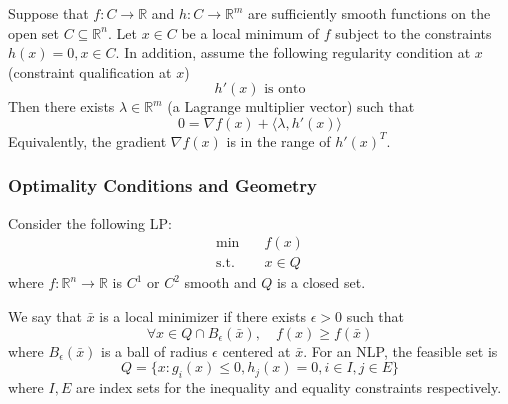 \begin{theorem}
    Suppose that $f: C \to \mathbb R$ and $h: C \to \mathbb R^m$ are sufficiently smooth functions on the open set $C \subseteq \mathbb R^n$. Let $x \in C$ be a local minimum of $f$ subject to the constraints $h(x) = 0, x \in C$. In addition, assume the following regularity condition at $x$ (constraint qualification at $x$) $$h'(x) \text{ is onto}$$
    Then there exists $\lambda \in \mathbb R^m$ (a Lagrange multiplier vector) such that $$0 = \nabla f(x) + \langle \lambda, h'(x) \rangle$$ Equivalently, the gradient $\nabla f(x)$ is in the range of $h'(x)^T$.
\end{theorem}
\subsubsection{Optimality Conditions and Geometry}
Consider the following LP:
\begin{align*}
    \min \quad & f(x) \\
    \text{s.t.} \quad & x \in Q
\end{align*}
where $f: \mathbb R^n \to \mathbb R$ is $C^1$ or $C^2$ smooth and $Q$ is a closed set.

We say that $\bar x$ is a local minimizer if there exists $\epsilon > 0$ such that $$\forall x \in Q \cap B_\epsilon(\bar x), \quad f(x) \geq f(\bar x)$$ where $B_\epsilon(\bar x)$ is a ball of radius $\epsilon$ centered at $\bar x$. For an NLP, the feasible set is 
$$Q = \{x: g_i(x) \leq 0, h_j(x) = 0, i \in I, j \in E\}$$
where $I,E$ are index sets for the inequality and equality constraints respectively.


